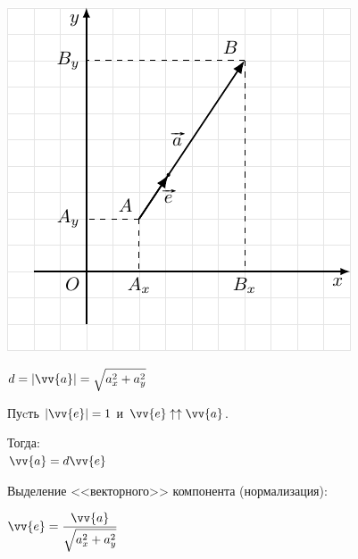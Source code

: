 \documentclass[10pt]{beamer}
\begin{document}
    
    {
    	{
    		
			\includegraphics{veconscalar.pdf}
    		
    		
    	}
    	{
    		$d = |\vv{a}| = \sqrt{a_x^2 + a_y^2}$
    		
    		\hfill 
    		
    		Пуcть $|\vv{e}| = 1$ и $\vv{e} \uparrow \uparrow \vv{a} $.
    		
    		Тогда: \\
    		$\vv{a} = d\vv{e}$ 
    		
    		\hfill
    		
    		{\scriptsize Выделение <<векторного>> компонента (нормализация):}
    		
    		$\vv{e} = \displaystyle\frac{\vv{a}}{\sqrt{a_x^2 + a_y^2}}$
    		
    	
    	}
    	
    }
    
    
    
    
    
\end{document}
